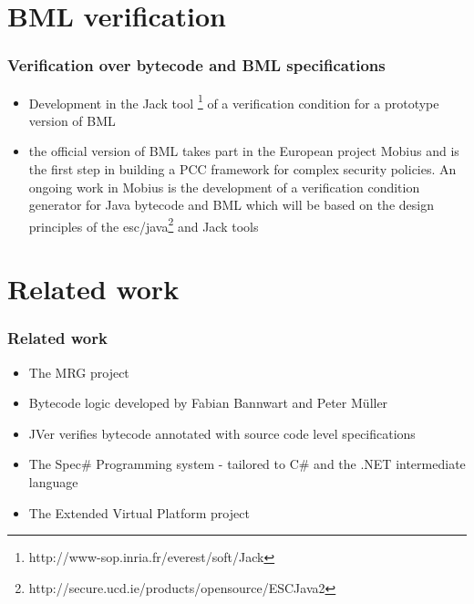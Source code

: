\documentclass[c]{beamer}
\begin{document}
\section{BML verification}

\begin{frame}\frametitle{Verification over bytecode and BML specifications}
 \begin{itemize}
   \item Development in the Jack tool \footnote{http://www-sop.inria.fr/everest/soft/Jack} of a
         verification condition for a prototype version of BML 
   \item  the official version of BML takes part in the European project Mobius  and is the first step in building a PCC framework
           for complex security policies. An ongoing work in Mobius  is the development of a 
	   verification condition generator for Java bytecode and BML 
	   which will be based on the design principles of the esc/java\footnote{http://secure.ucd.ie/products/opensource/ESCJava2} and Jack tools
\end{itemize}
\end{frame}







\section{Related work}

\begin{frame}\frametitle{Related work}
\begin{itemize}
      \item The MRG project 
      \item Bytecode logic developed by Fabian Bannwart  and  Peter M{\"u}ller
      \item JVer verifies bytecode annotated with source code level specifications 
      \item The Spec\# Programming system - tailored to C\# and the .NET intermediate language
      \item The Extended Virtual Platform project
\end{itemize}
\end{frame}
\end{document}

